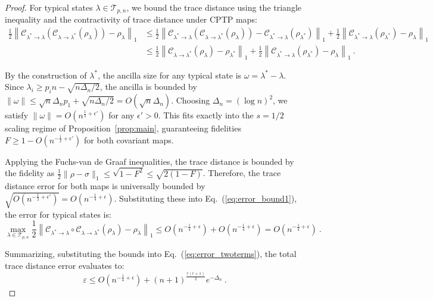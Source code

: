 \documentclass[11pt,letterpaper]{article}
\def\eps{\varepsilon}
\def\map{\mathcal}
\begin{document}
\begin{proof}
For typical states $\lambda\in\mathcal{T}_{p,n}$, we bound the trace distance using the triangle inequality and the contractivity of trace distance under CPTP maps:
\begin{equation}\label{eq:error_bound1}
\begin{aligned}
    \frac12\left\|\map{C}_{\lambda^*\to \lambda}\left(\map{C}_{\lambda\to \lambda^*}(\rho_\lambda)\right)-\rho_\lambda\right\|_1 
    &\le \frac12\left\|\map{C}_{\lambda^*\to \lambda}\left(\map{C}_{\lambda\to \lambda^*}(\rho_\lambda)\right) - \map{C}_{\lambda^*\to \lambda}(\rho_{\lambda^*})\right\|_1 + \frac12\left\|\map{C}_{\lambda^*\to \lambda}(\rho_{\lambda^*}) - \rho_\lambda\right\|_1 \\
    &\le \frac12\left\|\map{C}_{\lambda\to \lambda^*}(\rho_\lambda) - \rho_{\lambda^*}\right\|_1 + \frac12\left\|\map{C}_{\lambda^*\to \lambda}(\rho_{\lambda^*}) - \rho_\lambda\right\|_1 \ .
\end{aligned}
\end{equation}

By the construction of $\lambda^*$, the ancilla size for any typical state is $\omega = \lambda^* - \lambda$. Since $\lambda_i \ge p_i n - \sqrt{n\Delta_n/2}$, the ancilla is bounded by $\|\omega\| \le \sqrt{n}\Delta_n p_1 + \sqrt{n\Delta_n/2} = O(\sqrt{n}\Delta_n)$. 
Choosing $\Delta_n = (\log n)^2$, we satisfy $\|\omega\| = O(n^{\frac12+\epsilon'})$ for any $\epsilon' > 0$. This fits exactly into the $s = 1/2$ scaling regime of Proposition~\ref{prop:main}, guaranteeing fidelities $F \ge 1 - O(n^{-\frac12 + \epsilon'})$ for both covariant maps.

Applying the Fuchs-van de Graaf inequalities, the trace distance is bounded by the fidelity as $\frac{1}{2}\|\rho-\sigma\|_1 \le \sqrt{1-F^2} \le \sqrt{2(1-F)}$. Therefore, the trace distance error for both maps is universally bounded by $\sqrt{O(n^{-\frac12+\epsilon'})} = O(n^{-\frac14+\epsilon})$. Substituting these into Eq.~(\ref{eq:error_bound1}), the error for typical states is:
\begin{equation}
    \max_{\lambda\in\mathcal{T}_{p,n}} \frac12\left\|\map{C}_{\lambda^*\to \lambda}\circ\map{C}_{\lambda\to \lambda^*}(\rho_\lambda)-\rho_\lambda\right\|_1 \le O(n^{-\frac14+\epsilon}) + O(n^{-\frac14+\epsilon}) = O(n^{-\frac14+\epsilon}) \ .
\end{equation}

Summarizing, substituting the bounds into Eq.~(\ref{eq:error_twoterms}), the total trace distance error evaluates to:
\begin{equation}
    \eps \le O(n^{-\frac14+\epsilon}) + (n+1)^{\frac{r(r+1)}2} e^{-\Delta_n} \ .
\end{equation}


\end{proof}
\end{document}
